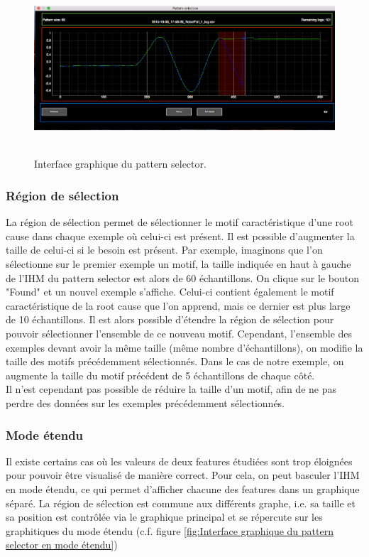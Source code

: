 \begin{figure}[h]
	\centering\includegraphics[height=6.4cm]{images/pattern_selector.png}
	\caption[Interface graphique du pattern selector]{Interface graphique du pattern selector.}
	\label{fig:Interface graphique du pattern selector}
\end{figure}

\subsubsection{Région de sélection}
\label{Industrialisation du produit: Outils graphiques: Pattern selection: La région de sélection}
La région de sélection permet de sélectionner le motif caractéristique d'une root cause dans chaque exemple où celui-ci est présent. Il est possible d'augmenter la taille de celui-ci si le besoin est présent. Par exemple, imaginons que l'on sélectionne sur le premier exemple un motif, la taille indiquée en haut à gauche de l'IHM du pattern selector est alors de 60 échantillons. On clique sur le bouton "Found" et un nouvel exemple s'affiche. Celui-ci contient également le motif caractéristique de la root cause que l'on apprend, mais ce dernier est plus large de 10 échantillons. Il est alors possible d'étendre la région de sélection pour pouvoir sélectionner l'ensemble de ce nouveau motif. Cependant, l'ensemble des exemples devant avoir la même taille (même nombre d'échantillons), on modifie la taille des motifs précédemment sélectionnés. Dans le cas de notre exemple, on augmente la taille du motif précédent de 5 échantillons de chaque côté. \\
Il n'est cependant pas possible de réduire la taille d'un motif, afin de ne pas perdre des données sur les exemples précédemment sélectionnés. 


\subsubsection{Mode étendu}
\label{Industrialisation du produit: Outils graphiques: Pattern selection: Mode étendu}
Il existe certains cas où les valeurs de deux features étudiées sont trop éloignées pour pouvoir être visualisé de manière correct. Pour cela, on peut basculer l'IHM en mode étendu, ce qui permet d'afficher chacune des features dans un graphique séparé. La région de sélection est commune aux différents graphe, i.e. sa taille et sa position est contrôlée via le graphique principal et se répercute sur les graphitiques du mode étendu (c.f. figure \ref{fig:Interface graphique du pattern selector en mode étendu})

